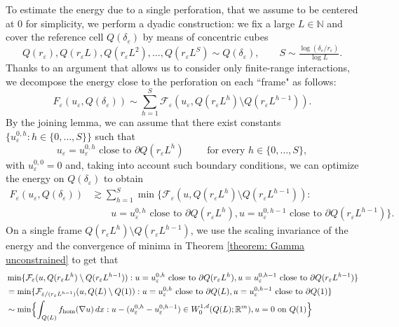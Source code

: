 \documentclass{article}
\theoremstyle{plain}
\theoremstyle{definition}
\def\e{\varepsilon}
\newcommand{\F}{\mathcal{F}}
\numberwithin{equation}{section}
\begin{document}
To estimate the energy due to a single perforation, that we assume to be centered at $0$ for simplicity, we perform a dyadic construction: we fix a large $L\in \mathbb N$ and cover the reference cell $Q(\delta_\e)$ by means of  concentric cubes
\begin{equation*}
    Q(r_\varepsilon),Q(r_\varepsilon L), Q(r_\varepsilon L^2),\dots, Q(r_\varepsilon L^{S})\sim Q(\delta_\varepsilon), \qquad S\sim \tfrac{\log (\delta_\varepsilon/r_\varepsilon)}{\log L}.
\end{equation*}
Thanks to an argument that allows us to consider only finite-range interactions, we decompose the energy close to the perforation on each ``frame" as follows:
\begin{equation*}
    F_{\varepsilon}(u_\varepsilon, Q(\delta_\varepsilon)) \sim  \sum_{h=1}^S \F_{\varepsilon}(u_\e, Q(r_\varepsilon L^{h})\setminus Q(r_\varepsilon L^{h-1})).
\end{equation*}
By the joining lemma, we can assume that there exist constants $\{u_\e^{0,h}: h\in\{0,\dots,S\}\}$ such that
\begin{equation*}
    u_\varepsilon=u_\varepsilon^{0,h} \text{ close to } \partial Q(r_\varepsilon L^{h}) \qquad \text{ for every } h\in\{0,\dots, S\},
\end{equation*}
with $u_\e^{0,0}=0$ and, taking into account such boundary conditions, we can optimize the energy on $Q(\delta_\e)$ to obtain
\begin{align*}
    F_{\varepsilon}(u_\varepsilon, Q(\delta_\varepsilon)) & \gtrsim  \sum_{h=1}^S \min\{\F_{\varepsilon}(u, Q(r_\varepsilon L^{h})\setminus Q(r_\varepsilon L^{h-1})) : \\& \quad \quad u=  u_\varepsilon^{0,h} \text{ close to }\partial Q(r_\varepsilon L^{h}),  u=u_\varepsilon^{0,h-1} \text{ close to }\partial Q(r_\varepsilon L^{h-1})\}.
\end{align*}
On a single frame $Q(r_\varepsilon L^{h})\setminus Q(r_\varepsilon L^{h-1})$, we use the scaling invariance of the energy and the convergence of minima in Theorem \ref{theorem: Gamma unconstrained} to get that
\begin{align}\notag
          &\min\{\F_{\varepsilon}(u, Q(r_\varepsilon L^{h})\setminus Q(r_\varepsilon L^{h-1})) : u=  u_\varepsilon^{0,h} \text{ close to }\partial Q(r_\varepsilon L^{h}), u= u_\varepsilon^{0,h-1} \text{ close to }\partial Q(r_\varepsilon L^{h-1})\} \\ \notag
          & =\min\{\F_{\varepsilon/(r_\e L^{h-1})}(u, Q(L)\setminus Q(1)) :   u=  u_\varepsilon^{0,h} \text{ close to }\partial Q(L), u= u_\varepsilon^{0,h-1} \text{ close to }\partial Q(1)\} \\ \label{perf: heur}
          & \sim\min\Bigl\{\int_{Q(L)} f_{\rm hom}(\nabla u)\,dx : u-(u_\varepsilon^{0,h}-u_\varepsilon^{0,h-1})\in W^{1,d}_0(Q(L); \mathbb R^m),  u=0 \text{ on } Q(1)\Bigr\}
     \end{align}
\end{document}
